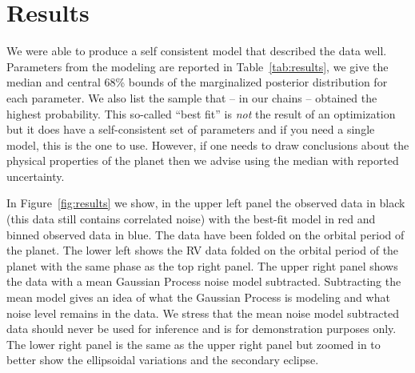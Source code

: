 \documentclass[apjl]{emulateapj}
\begin{document}
\section{Results}
We were able to produce a self consistent model that described the data well. Parameters from the modeling are reported in Table~\ref{tab:results}, we give the median and central 68\% bounds of the marginalized posterior distribution for each parameter. We also list the sample that -- in our chains -- obtained the highest probability. This so-called ``best fit'' is \emph{not} the result of an optimization but it does have a self-consistent set of parameters and if you need a single model, this is the one to use. However, if one needs to draw conclusions about the physical properties of the planet then we advise using the median with reported uncertainty.

In Figure~\ref{fig:results} we show, in the upper left panel the observed data in black (this data still contains correlated noise) with the best-fit model in red and binned observed data in blue. The data have been folded on the orbital period of the planet. The lower left shows the RV data folded on the orbital period of the planet with the same phase as the top right panel. The upper right panel shows the data with a mean Gaussian Process noise model subtracted. Subtracting the mean model gives an idea of what the Gaussian Process is modeling and what noise level remains in the data. We stress that the mean noise model subtracted data should never be used for inference and is for demonstration purposes only. The lower right panel is the same as the upper right panel but zoomed in to better show the ellipsoidal variations and the secondary eclipse.
\end{document}

